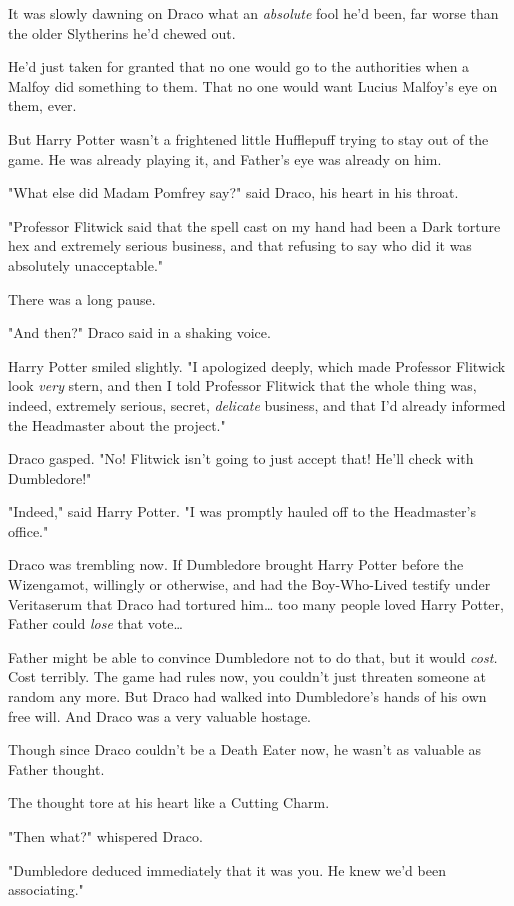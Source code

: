 It was slowly dawning on Draco what an \emph{absolute} fool he'd been, far
worse than the older Slytherins he'd chewed out.

He'd just taken for granted that no one would go to the authorities when a
Malfoy did something to them. That no one would want Lucius Malfoy's eye on
them, ever.

But Harry Potter wasn't a frightened little Hufflepuff trying to stay out of
the game. He was already playing it, and Father's eye was already on him.

"What else did Madam Pomfrey say?" said Draco, his heart in his throat.

"Professor Flitwick said that the spell cast on my hand had been a Dark torture
hex and extremely serious business, and that refusing to say who did it was
absolutely unacceptable."

There was a long pause.

"And then?" Draco said in a shaking voice.

Harry Potter smiled slightly. "I apologized deeply, which made Professor
Flitwick look \emph{very} stern, and then I told Professor Flitwick that the
whole thing was, indeed, extremely serious, secret, \emph{delicate} business,
and that I'd already informed the Headmaster about the project."

Draco gasped. "No! Flitwick isn't going to just accept that! He'll check with
Dumbledore!"

"Indeed," said Harry Potter. "I was promptly hauled off to the Headmaster's
office."

Draco was trembling now. If Dumbledore brought Harry Potter before the
Wizengamot, willingly or otherwise, and had the Boy-Who-Lived testify under
Veritaserum that Draco had tortured him{\ldots} too many people loved Harry
Potter, Father could \emph{lose} that vote{\ldots}

Father might be able to convince Dumbledore not to do that, but it would
\emph{cost.} Cost terribly. The game had rules now, you couldn't just threaten
someone at random any more. But Draco had walked into Dumbledore's hands of his
own free will. And Draco was a very valuable hostage.

Though since Draco couldn't be a Death Eater now, he wasn't as valuable as
Father thought.

The thought tore at his heart like a Cutting Charm.

"Then what?" whispered Draco.

"Dumbledore deduced immediately that it was you. He knew we'd been associating."

